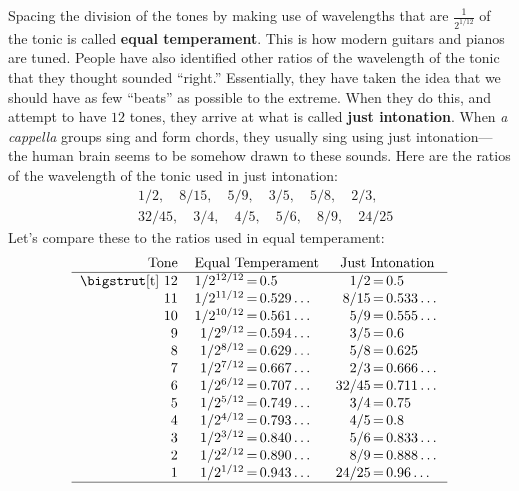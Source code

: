 Spacing the division of the tones by making use of wavelengths that
are $\frac{1}{2^{1/12}}$ of the tonic is called \textbf{equal
  temperament}. This is how modern guitars
and pianos are tuned. People have also identified other ratios of the
wavelength of the tonic that they thought sounded ``right.''
Essentially, they have taken the idea that we should have as few
``beats'' as possible to the extreme. When they do this, and attempt
to have $12$ tones, they arrive at what is called \textbf{just
  intonation}. When \textit{a
  cappella} groups sing and form
chords, they usually sing using just intonation---the human brain
seems to be somehow drawn to these sounds. Here are the ratios of the
wavelength of the tonic used in just intonation:
\begin{align*}
&1/2,\quad 8/15,\quad 5/9,\quad 3/5,\quad 5/8,\quad 2/3,\\
&32/45,\quad 3/4,\quad 4/5,\quad 5/6,\quad 8/9,\quad 24/25
\end{align*}
Let's compare these to the ratios used in equal temperament:
\[
\begin{tabular}{rr@{\,}c@{\,}lr@{\,}c@{\,}l}
Tone & \multicolumn{3}{c}{Equal Temperament}   & \multicolumn{3}{c}{Just Intonation}   \\ \hline
\bigstrut[t] $12$ & $1/2^{12/12}$ & $=$ & $0.5$         & $1/2$   & $=$& $0.5$      \\
$11$ & $1/2^{11/12}$ & $=$ & $0.529\dots$  & $8/15$  & $=$& $0.533\dots$ \\
$10$ & $1/2^{10/12}$ & $=$ & $0.561\dots$  & $5/9$   & $=$& $0.555\dots$    \\
$9$  & $1/2^{9/12}$  & $=$ & $0.594\dots$  & $3/5$   & $=$& $0.6$ \\
$8$  & $1/2^{8/12}$  & $=$ & $0.629\dots$  & $5/8$   & $=$& $0.625$ \\
$7$  & $1/2^{7/12}$  & $=$ & $0.667\dots$  & $2/3$   & $=$& $0.666\dots$ \\
$6$  & $1/2^{6/12}$  & $=$ & $0.707\dots$  & $32/45$ & $=$& $0.711\dots$ \\
$5$  & $1/2^{5/12}$  & $=$ & $0.749\dots$  & $3/4$   & $=$& $0.75$ \\
$4$  & $1/2^{4/12}$  & $=$ & $0.793\dots$  & $4/5$   & $=$& $0.8$ \\
$3$  & $1/2^{3/12}$  & $=$ & $0.840\dots$  & $5/6$   & $=$& $0.833\dots$ \\
$2$  & $1/2^{2/12}$  & $=$ & $0.890\dots$  & $8/9$   & $=$& $0.888\dots$ \\
$1$  & $1/2^{1/12}$  & $=$ & $0.943\dots$  & $24/25$ & $=$& $0.96\dots$ \\ \hline
\end{tabular}
\]
